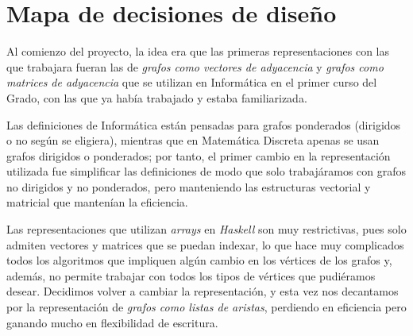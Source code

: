 
\section{Mapa de decisiones de diseño}

Al comienzo del proyecto, la idea era que las primeras representaciones con las que 
trabajara fueran las de \textit{grafos como vectores de adyacencia} y 
\textit{grafos como matrices de adyacencia} que se utilizan en Informática en el
primer curso del Grado, con las que ya había trabajado y estaba familiarizada. 

Las definiciones de Informática están pensadas para grafos ponderados (dirigidos 
o no según se eligiera), mientras que en Matemática Discreta apenas se usan grafos 
dirigidos o ponderados; por tanto, el primer cambio en la representación 
utilizada fue simplificar las definiciones de modo que solo trabajáramos con grafos
no dirigidos y no ponderados, pero manteniendo las estructuras vectorial y 
matricial que mantenían la eficiencia. 

Las representaciones que utilizan \textit{arrays} en \textit{Haskell} son muy
restrictivas, pues solo admiten vectores y matrices que se puedan indexar, lo
que hace muy complicados todos los algoritmos que impliquen algún cambio en los
vértices de los grafos y, además, no permite trabajar con todos los tipos de
vértices que pudiéramos desear. Decidimos volver a cambiar la representación, y
esta vez nos decantamos por la representación de \textit{grafos como listas de
aristas}, perdiendo en eficiencia pero ganando mucho en flexibilidad de
escritura.


